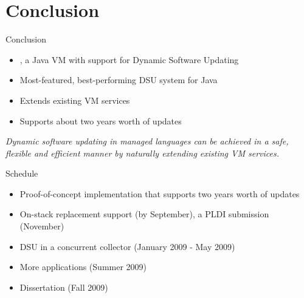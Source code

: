 
\section{Conclusion}
\ShowTOC

\begin{frame}{Conclusion}%
\begin{itemize}
\item \DSU{}, a Java VM with support for Dynamic Software Updating
\item Most-featured, best-performing DSU system for Java
\item Extends existing VM services
\item Supports about two years worth of updates
\end{itemize}
\begin{block}{}
\emph{Dynamic software updating in managed languages can be achieved in a
safe, flexible and efficient manner by naturally extending existing VM
services.}
\end{block}
\end{frame}

\begin{frame}{Schedule}%
\begin{itemize}
\item Proof-of-concept implementation that supports two years worth of
      updates
\item<2-> On-stack replacement support (by September), a PLDI submission
      (November)
\item<2-> DSU in a concurrent collector (January 2009 - May 2009)
\item<2-> More applications (Summer 2009)
\item<2-> Dissertation (Fall 2009)
\end{itemize}
\end{frame}
